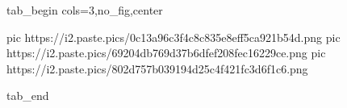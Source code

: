  
 
 
 
 


\ifcmt
  tab_begin cols=3,no_fig,center

     pic https://i2.paste.pics/0c13a96c3f4c8c835e8eff5ca921b54d.png
		 pic https://i2.paste.pics/69204db769d37b6dfef208fec16229ce.png
		 pic https://i2.paste.pics/802d757b039194d25c4f421fc3d6f1c6.png

  tab_end
\fi
